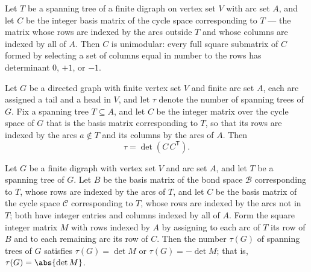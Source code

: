 \begin{theorem}
\label{CycleSpace.isUnimodular_basisMatrix_cycleSpace}
\leanok
{}
Let $T$ be a spanning tree of a finite digraph on vertex set $V$ with arc set $A$, and
let $C$ be the integer basis matrix of the cycle space corresponding to $T$ — the matrix
whose rows are indexed by the arcs outside $T$ and whose columns are indexed by all of
$A$. Then $C$ is unimodular: every full square submatrix of $C$ formed by selecting a
set of columns equal in number to the rows has determinant $0$, $+1$, or $-1$.
\end{theorem}

\begin{theorem}
\label{CycleSpace.tau_eq_det_mul_transpose_cycleSpace}
Let $G$ be a directed graph with finite vertex set $V$ and finite arc set $A$, each arc
assigned a tail and a head in $V$, and let $\tau$ denote the number of spanning trees of
$G$. Fix a spanning tree $T \subseteq A$, and let $C$ be the integer matrix over the
cycle space of $G$ that is the basis matrix corresponding to $T$, so that its rows are
indexed by the arcs $a \notin T$ and its columns by the arcs of $A$. Then
\[
\tau = \det\!\left(C\,C^{\mathsf{T}}\right).
\]
\end{theorem}

\begin{theorem}
\label{CycleSpace.tau_eq_det_fromBlocks}
\leanok
{}
Let $G$ be a finite digraph with vertex set $V$ and arc set $A$, and let $T$ be a
spanning tree of $G$. Let $B$ be the basis matrix of the bond space $\mathcal{B}$
corresponding to $T$, whose rows are indexed by the arcs of $T$, and let $C$ be the
basis matrix of the cycle space $\mathcal{C}$ corresponding to $T$, whose rows are
indexed by the arcs not in $T$; both have integer entries and columns indexed by all of
$A$. Form the square integer matrix $M$ with rows indexed by $A$ by assigning to each
arc of $T$ its row of $B$ and to each remaining arc its row of $C$. Then the number
$\tau(G)$ of spanning trees of $G$ satisfies $\tau(G) = \det M$ or $\tau(G) = -\det M$;
that is, $\tau(G) = \abs{\det M}$.
\end{theorem}

